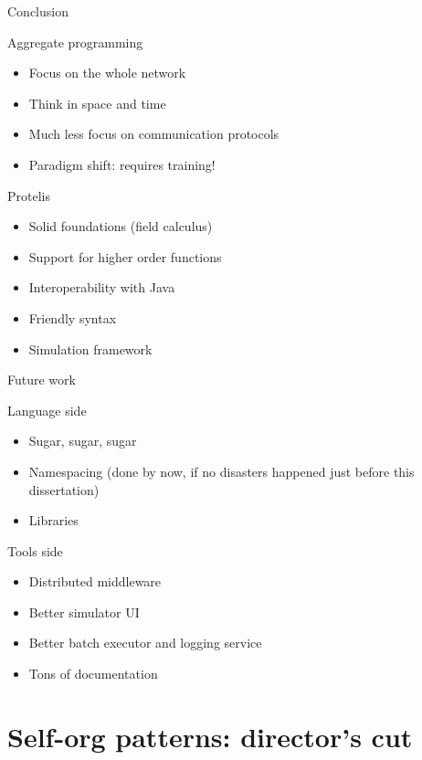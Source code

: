 \documentclass[presentation]{beamer}\mode<presentation>{\usetheme{sapere}}
\begin{document}
\begin{frame}{Conclusion}
  \begin{block} {Aggregate programming}
   \begin{itemize}
    \item Focus on the whole network
    \item Think in space and time
    \item Much less focus on communication protocols
    \item Paradigm shift: requires training!
   \end{itemize}
  \end{block}
  \begin{block} {Protelis}
   \begin{itemize}
    \item Solid foundations (field calculus)
    \item Support for higher order functions
    \item Interoperability with Java
    \item Friendly syntax
    \item Simulation framework
   \end{itemize}
  \end{block}
\end{frame}

\begin{frame}{Future work}
  \begin{block} {Language side}
   \begin{itemize}
    \item Sugar, sugar, sugar
    \item Namespacing (done by now, if no disasters happened just before this dissertation)
    \item Libraries
   \end{itemize}
  \end{block}
  \begin{block} {Tools side}
   \begin{itemize}
    \item Distributed middleware
    \item Better simulator UI
    \item Better batch executor and logging service
    \item Tons of documentation
   \end{itemize}
  \end{block}
\end{frame}

\section*{Self-org patterns: director's cut}
\end{document}
